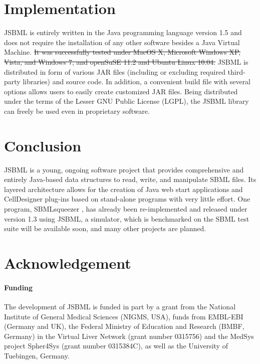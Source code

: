 \documentclass{bioinfo}
\begin{document}
\section{Implementation}

JSBML is entirely written in the Java\texttrademark{} programming language version 1.5 and does 
not require the installation of any other software besides a Java Virtual
Machine.\sout{ It was successfully tested under MacOS X, Microsoft Windows XP,
Vista, and Windows 7, and openSuSE 11.2 and Ubuntu Linux 10.04.} JSBML is
distributed in form of various JAR files (including or excluding  required
third-party libraries) and source code. In addition, a convenient build file
with several options allows users to easily create customized JAR files.
Being distributed under the terms of the Lesser GNU
Public License (LGPL), the JSBML library can freely be used even in proprietary software.



\section{Conclusion}

JSBML is a young, ongoing software project that
provides comprehensive and entirely Java-based data structures
to read, write, and manipulate SBML files. Its layered architecture
allows for the creation of Java web start applications and
CellDesigner plug-ins based on stand-alone programs with very
little effort. One program, SBMLsqueezer \citep{Draeger2008}, has already been
re-implemented and released under version 1.3 using JSBML, a simulator, which is
benchmarked on the SBML test suite will be available soon, and
many other projects are planned.

\section*{Acknowledgement}

\paragraph{Funding\textcolon}

The development of JSBML is funded in part by a grant from the National Institute
of General Medical Sciences (NIGMS, USA), funds from EMBL-EBI (Germany and UK), 
the Federal Ministry of Education and Research (BMBF, Germany) in the Virtual 
Liver Network (grant number 0315756) and the MedSys project Spher4Sys 
(grant number 0315384C), as well as the University of Tuebingen, Germany. 
\end{document}
